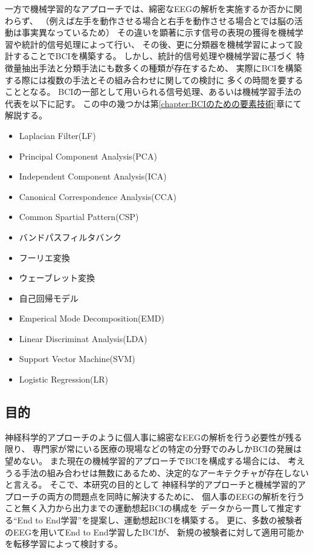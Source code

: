 一方で機械学習的なアプローチでは、綿密なEEGの解析を実施するか否かに関わらず、
（例えば左手を動作させる場合と右手を動作させる場合とでは脳の活動は事実異なっているため）
その違いを顕著に示す信号の表現の獲得を機械学習や統計的信号処理によって行い、
その後、更に分類器を機械学習によって設計することでBCIを構築する。
しかし、統計的信号処理や機械学習に基づく
特徴量抽出手法と分類手法にも数多くの種類が存在するため、
実際にBCIを構築する際には複数の手法とその組み合わせに関しての検討に
多くの時間を要することとなる。
BCIの一部として用いられる信号処理、あるいは機械学習手法の代表を以下に記す。
この中の幾つかは第\ref{chapter:BCIのための要素技術}章にて解説する。
\begin{itemize}
    \item Laplacian Filter(LF)
    \item Principal Component Analysis(PCA)
    \item Independent Component Analysis(ICA)
    \item Canonical Correspondence Analysis(CCA)
    \item Common Spartial Pattern(CSP)
    \item バンドパスフィルタバンク
    \item フーリエ変換
    \item ウェーブレット変換
    \item 自己回帰モデル
    \item Emperical Mode Decomposition(EMD)
    \item Linear Discriminat Analysis(LDA)
    \item Support Vector Machine(SVM)
    \item Logistic Regression(LR)
\end{itemize}

\subsection{\mc 目的}
神経科学的アプローチのように個人事に綿密なEEGの解析を行う必要性が残る限り、
専門家が常にいる医療の現場などの特定の分野でのみしかBCIの発展は望めない。
また現在の機械学習的アプローチでBCIを構成する場合には、
考えうる手法の組み合わせは無数にあるため、決定的なアーキテクチャが存在しないと言える。
そこで、本研究の目的として
神経科学的アプローチと機械学習的アプローチの両方の問題点を同時に解決するために、
個人事のEEGの解析を行うこと無く入力から出力までの運動想起BCIの構成を
データから一貫して推定する``End to End学習''を提案し、運動想起BCIを構築する。
更に、多数の被験者のEEGを用いてEnd to End学習したBCIが、
新規の被験者に対して適用可能かを転移学習\cite{転移学習}によって検討する。

